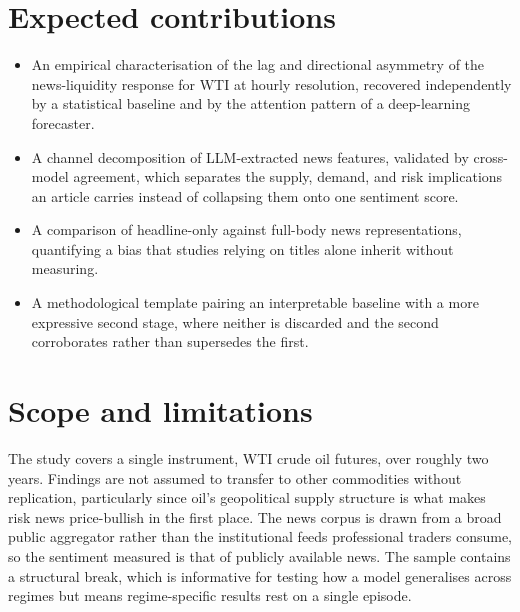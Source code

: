\documentclass[11pt,a4paper]{article}
\begin{document}
\section{Expected contributions}

\begin{itemize}
  \item An empirical characterisation of the lag and directional asymmetry of the news-liquidity response for WTI at hourly resolution, recovered independently by a statistical baseline and by the attention pattern of a deep-learning forecaster.
  \item A channel decomposition of LLM-extracted news features, validated by cross-model agreement, which separates the supply, demand, and risk implications an article carries instead of collapsing them onto one sentiment score.
  \item A comparison of headline-only against full-body news representations, quantifying a bias that studies relying on titles alone inherit without measuring.
  \item A methodological template pairing an interpretable baseline with a more expressive second stage, where neither is discarded and the second corroborates rather than supersedes the first.
\end{itemize}

\section{Scope and limitations}

The study covers a single instrument, WTI crude oil futures, over roughly two years. Findings are not assumed to transfer to other commodities without replication, particularly since oil's geopolitical supply structure is what makes risk news price-bullish in the first place. The news corpus is drawn from a broad public aggregator rather than the institutional feeds professional traders consume, so the sentiment measured is that of publicly available news. The sample contains a structural break, which is informative for testing how a model generalises across regimes but means regime-specific results rest on a single episode.



\end{document}
